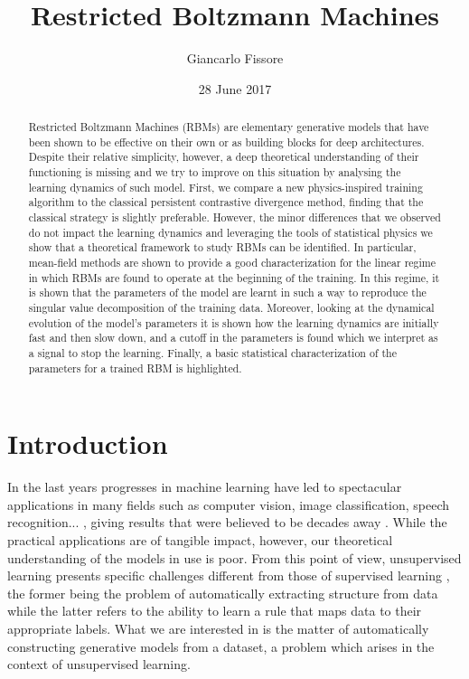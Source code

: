 \documentclass{revtex4-1}
\begin{document}
\title{Restricted Boltzmann Machines}

\author{Giancarlo Fissore}

\date{28 June 2017}

\begin{abstract}
Restricted Boltzmann Machines (RBMs) are elementary generative models that have been shown to be effective on their own or as building blocks for deep architectures. Despite their relative simplicity, however, a deep theoretical understanding of their functioning is missing and we try to improve on this situation by analysing the learning dynamics of such model. First, we compare a new physics-inspired training algorithm to the classical persistent contrastive divergence method, finding that the classical strategy is slightly preferable. However, the minor differences that we observed do not impact the learning dynamics and leveraging the tools of statistical physics we show that a theoretical framework to study RBMs can be identified. In particular, mean-field methods are shown to provide a good characterization for the linear regime in which RBMs are found to operate at the beginning of the training. In this regime, it is shown that the parameters of the model are learnt in such a way to reproduce the singular value decomposition of the training data. Moreover, looking at the dynamical evolution of the model's parameters it is shown how the learning dynamics are initially fast and then slow down, and a cutoff in the parameters is found which we interpret as a signal to stop the learning. Finally, a basic statistical characterization of the parameters for a trained RBM is highlighted.
\end{abstract}

\maketitle

\section*{Introduction}
In the last years progresses in machine learning have led to spectacular applications in many fields such as computer vision, image classification, speech recognition... \cite{}\cite{}, giving results that were believed to be decades away \cite{}. While the practical applications are of tangible impact, however, our theoretical understanding of the models in use is poor. From this point of view, unsupervised learning presents specific challenges different from those of supervised learning \cite{foundations}, the former being the problem of automatically extracting structure from data while the latter refers to the ability to learn a rule that maps data to their appropriate labels. What we are interested in is the matter of automatically constructing generative models from a dataset, a problem which arises in the context of unsupervised learning.
\end{document}
